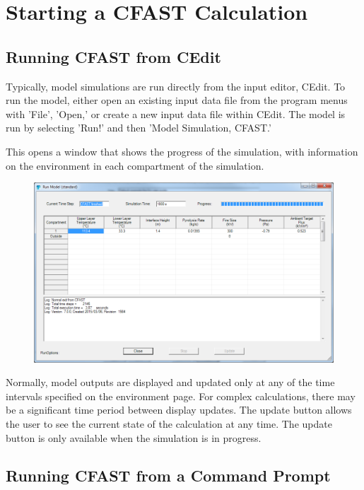 \section{Starting a CFAST Calculation}

\subsection{Running CFAST from CEdit}

Typically, model simulations are run directly from the input editor, CEdit.  To run the model, either open an existing input data file from the program menus with 'File', 'Open,' or create a new input data file within CEdit.  The model is run by selecting 'Run!' and then 'Model Simulation, CFAST.'

This opens a window that shows the progress of the simulation, with information on the environment in each compartment of the simulation.

\begin{figure}[h!]
\begin{center}
\includegraphics[width=6.5in]{FIGURES/Running_CFAST/Standard_Output}
\end{center}
\end{figure}

Normally, model outputs are displayed and updated only at any of the time intervals specified on the environment page. For complex calculations, there may be a significant time period between display updates. The update button allows the user to see the current state of the calculation at any time. The update button is only available when the simulation is in progress.


\subsection{Running CFAST from a Command Prompt}

